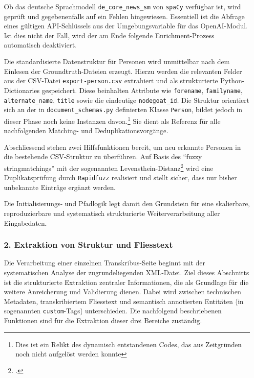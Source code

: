 \documentclass[12pt, a4paper, ngerman, bidi=default]{article}
\let\cite\footcite
\newcommand{\code}[1]{\colorbox{VeryLightGray}{\texttt{#1}}} %
\begin{document}
Ob das deutsche Sprachmodell 
\code{de\_core\_news\_sm} von \code{spaCy} verfügbar ist, wird geprüft und gegebenenfalls auf ein Fehlen hingewiesen. 
Essentiell ist die Abfrage eines gültigen 
API-Schlüssels aus der Umgebungsvariable für das OpenAI-Modul. Ist dies nicht der Fall, wird der am Ende folgende Enrichment-Prozess automatisch deaktiviert.

Die standardisierte Datenstruktur für Personen wird unmittelbar nach dem Einlesen der 
Groundtruth-Dateien erzeugt. Hierzu werden die relevanten Felder aus der CSV-Datei 
\code{export-person.csv} extrahiert und als strukturierte Python-Dictionaries gespeichert. 
Diese beinhalten Attribute wie \code{forename}, \code{familyname}, \code{alternate\_name}, 
\code{title} sowie die eindeutige \code{nodegoat\_id}. Die Struktur orientiert sich an der in 
\code{document\_schemas.py} definierten Klasse \code{Person}, bildet jedoch in dieser Phase noch 
keine Instanzen davon.\footnote{Dies ist ein Relikt des dynamisch entstandenen Codes, das aus Zeitgründen noch nicht aufgelöst werden konnte} Sie dient als Referenz für alle nachfolgenden Matching- und 
Deduplikationsvorgänge.

Abschliessend stehen zwei Hilfsfunktionen bereit, um neu erkannte Personen in die bestehende 
CSV-Struktur zu überführen. Auf Basis des \enquote{fuzzy stringmatchings} mit der sogenannten Levensthein-Distanz\cite[\textbf{Levensthein-Distanz:} Die minimale Anzahl von elementaren Editieroperationen (Einfügen, Löschen, Ersetzen), die notwendig sind, um ein Wort a in ein anderes Wort b zu überführen. vgl:][]{levenshtein_binary_nodate} wird eine Duplikatsprüfung 
durch \code{Rapidfuzz} realisiert und stellt sicher, dass nur bisher unbekannte Einträge ergänzt werden.

Die Initialisierungs- und Pfadlogik legt damit den Grundstein für eine skalierbare, 
reproduzierbare und systematisch strukturierte Weiterverarbeitung aller Eingabedaten.


\subsubsection*{2. Extraktion von Struktur und Fliesstext}

Die Verarbeitung einer einzelnen Transkribus-Seite beginnt mit der systematischen Analyse der zugrundeliegenden XML-Datei. 
Ziel dieses Abschnitts ist die strukturierte Extraktion zentraler Informationen, die als Grundlage für die weitere Anreicherung 
und Validierung dienen. Dabei wird zwischen technischen Metadaten, transkribiertem Fliesstext und semantisch annotierten Entitäten 
(in sogenannten \code{custom}-Tags) unterschieden. Die nachfolgend beschriebenen Funktionen sind für die Extraktion dieser drei 
Bereiche zuständig.
\end{document}

